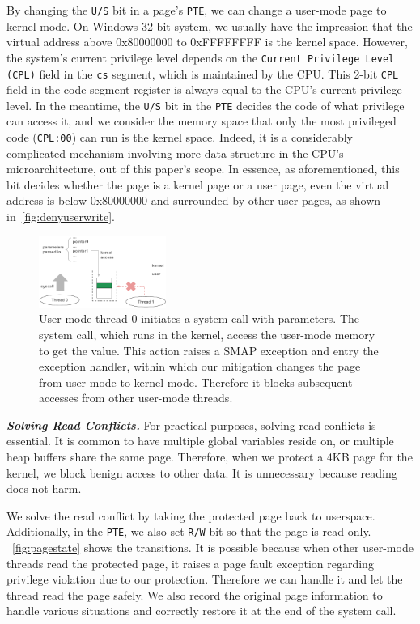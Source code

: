By changing the \texttt{U/S} bit in a page's \texttt{PTE}, we can change a user-mode page to kernel-mode. On Windows 32-bit system, we usually have the impression that the virtual address above 0x80000000 to 0xFFFFFFFF is the kernel space. However, the system's current privilege level depends on the \texttt{Current Privilege Level (CPL)} field in the \texttt{cs} segment, which is maintained by the CPU. This 2-bit \texttt{CPL} field in the code segment register is always equal to the CPU's current privilege level. In the meantime, the \texttt{U/S} bit in the \texttt{PTE} decides the code of what privilege can access it, and we consider the memory space that only the most privileged code (\texttt{CPL:00}) can run is the kernel space. Indeed, it is a considerably complicated mechanism involving more data structure in the CPU's microarchitecture, out of this paper's scope. In essence, as aforementioned, this bit decides whether the page is a kernel page or a user page, even the virtual address is below 0x80000000 and surrounded by other user pages, as shown in~\autoref{fig:denyuserwrite}.

\begin{figure}[th]
  \includegraphics[width=0.37\textwidth]{figures/denyuserwrite}
  \centering
  \caption{User-mode thread 0 initiates a system call with parameters. The system call, which runs in the kernel, access the user-mode memory to get the value. This action raises a SMAP exception and entry the exception handler, within which our mitigation changes the page from user-mode to kernel-mode. Therefore it blocks subsequent accesses from other user-mode threads.}
  \label{fig:denyuserwrite}
\end{figure}




\textbf{\textit{Solving Read Conflicts.}} For practical purposes, solving read conflicts is essential. It is common to have multiple global variables reside on, or multiple heap buffers share the same page. Therefore, when we protect a 4KB page for the kernel, we block benign access to other data.  It is unnecessary because reading does not harm.  

We solve the read conflict by taking the protected page back to userspace. Additionally, in the \texttt{PTE}, we also set \texttt{R/W} bit so that the page is read-only. ~\autoref{fig:pagestate} shows the transitions. It is possible because when other user-mode threads read the protected page, it raises a page fault exception regarding privilege violation due to our protection. Therefore we can handle it and let the thread read the page safely. We also record the original page information to handle various situations and correctly restore it at the end of the system call. 

